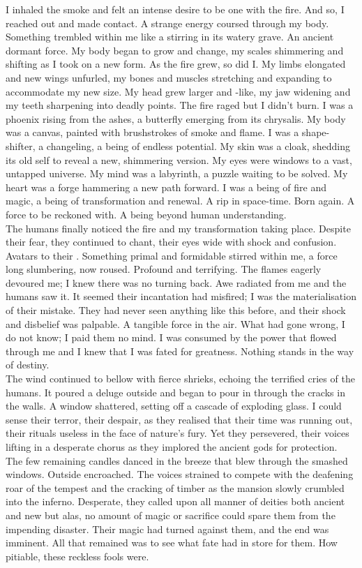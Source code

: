I inhaled the smoke and felt an intense desire to be one with the fire. And so, I reached out and made contact. A strange energy coursed through my body. Something trembled within me like a  stirring in its watery grave. An ancient dormant force. My body began to grow and change, my scales shimmering and shifting as I took on a new form. As the fire grew, so did I. My limbs elongated and new wings unfurled, my bones and muscles stretching and expanding to accommodate my new size. My head grew larger and -like, my jaw widening and my teeth sharpening into deadly points. The fire raged but I didn't burn. I was a phoenix rising from the ashes, a butterfly emerging from its chrysalis. My body was a canvas, painted with brushstrokes of smoke and flame. I was a shape-shifter, a changeling, a being of endless potential. My skin was a cloak, shedding its old self to reveal a new, shimmering version. My eyes were windows to a vast, untapped universe. My mind was a labyrinth, a puzzle waiting to be solved. My heart was a forge hammering a new path forward. I was a being of fire and magic, a being of transformation and renewal. A rip in space-time. Born again. A force to be reckoned with. A being beyond human understanding. \\

The humans finally noticed the fire and my transformation taking place. Despite their fear, they continued to chant, their eyes wide with shock and confusion. Avatars to their . Something primal and formidable stirred within me, a force long slumbering, now roused. Profound and terrifying. The flames eagerly devoured me; I knew there was no turning back. Awe radiated from me and the humans saw it. It seemed their incantation had misfired; I was the materialisation of their mistake. They had never seen anything like this before, and their shock and disbelief was palpable. A tangible force in the air. What had gone wrong, I do not know; I paid them no mind. I was consumed by the power that flowed through me and I knew that I was fated for greatness. Nothing stands in the way of destiny. \\

The wind continued to bellow with fierce shrieks, echoing the terrified cries of the humans. It poured a deluge outside and began to pour in through the cracks in the walls. A window shattered, setting off a cascade of exploding glass. I could sense their terror, their despair, as they realised that their time was running out, their rituals useless in the face of nature's fury. Yet they persevered, their voices lifting in a desperate chorus as they implored the ancient gods for protection. The few remaining candles danced in the breeze that blew through the smashed windows. Outside encroached. The voices strained to compete with the deafening roar of the tempest and the cracking of timber as the mansion slowly crumbled into the inferno. Desperate, they called upon all manner of deities both ancient and new but alas, no amount of magic or sacrifice could spare them from the impending disaster. Their magic had turned against them, and the end was imminent. All that remained was to see what fate had in store for them. How pitiable, these reckless fools were. \\

